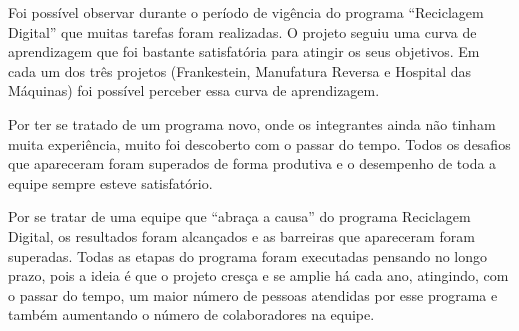\documentclass[
	12pt,				%
	openright,			%
	oneside,			%
	a4paper,			%
	english,			%
	spanish,			%
	brazil,				%
	]{abntex2}
\begin{document}
Foi possível observar durante o período de vigência do programa ``Reciclagem Digital'' que muitas tarefas foram realizadas. O projeto seguiu uma curva de aprendizagem que foi bastante satisfatória para atingir os seus objetivos. Em cada um dos três projetos (Frankestein, Manufatura Reversa e Hospital das Máquinas) foi possível perceber essa curva de aprendizagem.

Por ter se tratado de um programa novo, onde os integrantes ainda não tinham muita experiência, muito foi descoberto com o passar do tempo. Todos os desafios que apareceram foram superados de forma produtiva e o desempenho de toda a equipe sempre esteve satisfatório.

Por se tratar de uma equipe que ``abraça a causa'' do programa Reciclagem Digital, os resultados foram alcançados e as barreiras que apareceram foram superadas. Todas as etapas do programa foram executadas pensando no longo prazo, pois a ideia é que o projeto cresça e se amplie há cada ano, atingindo, com o passar do tempo, um maior número de pessoas atendidas por esse programa e também  aumentando o número de colaboradores na equipe.


\postextual



%
%

\end{document}

